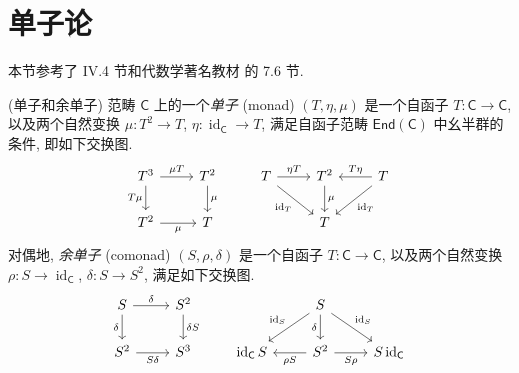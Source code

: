 
\section{单子论}

本节参考了 \cite{SGL} IV.4 节和代数学著名教材 \cite{lww2} 的 7.6 节.

\begin{definition}
    [label={monad-definition}]
    {(单子和余单子)}
    范畴 $\mathsf C$ 上的一个\emph{单子} (monad) $(T,\eta,\mu)$ 是一个自函子 $T \colon \mathsf C \to \mathsf C$, 以及两个自然变换 $\mu\colon T^2 \to T$, $\eta \colon \operatorname{id}_{\mathsf C} \to T$, 满足自函子范畴 $\mathsf {End}(\mathsf C)$ 中幺半群的条件, 即如下交换图.
\[\begin{tikzcd}[ampersand replacement=\&]
	{T^3} \& {T^2} \& {T} \& {T^2} \& {T} \\
	{T^2} \& T \&\& T
	\arrow["{\mu T}", from=1-1, to=1-2]
	\arrow["T\mu"', from=1-1, to=2-1]
	\arrow["\mu"', from=2-1, to=2-2]
	\arrow["\mu", from=1-2, to=2-2]
	\arrow["\mu", from=1-4, to=2-4]
	\arrow["{\operatorname{id}_T}"', from=1-3, to=2-4]
	\arrow["{\operatorname{id}_T}", from=1-5, to=2-4]
	\arrow["{\eta T}", from=1-3, to=1-4]
	\arrow["T\eta"', from=1-5, to=1-4]
\end{tikzcd}\]
	对偶地, \emph{余单子} (comonad) $(S,\rho,\delta)$ 是一个自函子 $T\colon \mathsf C\to\mathsf C$, 以及两个自然变换 $\rho\colon S\to \operatorname{id}_{\mathsf C}$, $\delta\colon S\to S^2$, 满足如下交换图.
	\[\begin{tikzcd}[ampersand replacement=\&]
		S \& {S^2} \&\& S \\
		{S^2} \& {S^3} \& {\operatorname{id}_{\mathsf C}S} \& {S^2} \& {S\operatorname{id}_{\mathsf C}}
		\arrow["{\delta S}", from=1-2, to=2-2]
		\arrow["S\delta"', from=2-1, to=2-2]
		\arrow["\delta"', from=1-1, to=2-1]
		\arrow["\delta", from=1-1, to=1-2]
		\arrow["\delta"', from=1-4, to=2-4]
		\arrow["{\operatorname{id}_S}"', from=1-4, to=2-3]
		\arrow["{\operatorname{id}_S}", from=1-4, to=2-5]
		\arrow["{\rho S}", from=2-4, to=2-3]
		\arrow["S\rho"', from=2-4, to=2-5]
	\end{tikzcd}\]
\end{definition}


